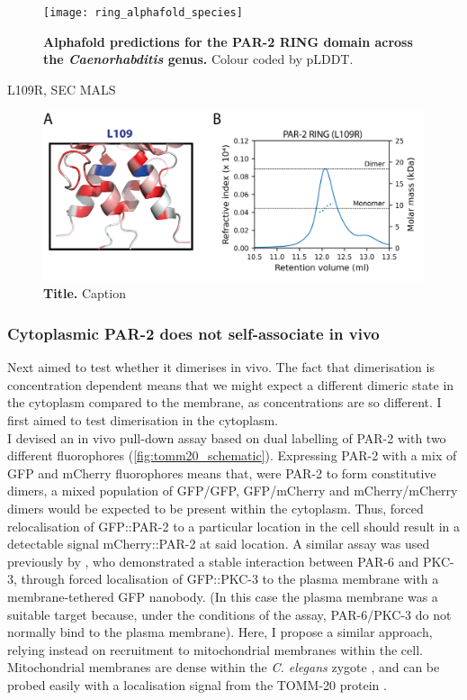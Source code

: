 \documentclass[12pt]{"article"}
\newcommand{\mycaption}[2]{\caption[#1]{\textbf{#1.} #2}}
\begin{document}
\begin{figure}
\texttt{[image: ring\_alphafold\_species]}
\centering
\mycaption{Alphafold predictions for the PAR-2 RING domain across the \textit{Caenorhabditis} genus}{
Colour coded by pLDDT.
}
\label{fig:ring_alphafold_species}
\end{figure}

L109R, SEC MALS\\

\begin{figure}
\includegraphics[scale=1]{l109r_sec_mals}
\centering
\mycaption{Title}{
Caption
}
\label{fig:l109r_sec_mals}
\end{figure}

\subsubsection{Cytoplasmic PAR-2  does not self-associate in vivo}

Next aimed to test whether it dimerises in vivo. The fact that dimerisation is concentration dependent means that we might expect a different dimeric state in the cytoplasm compared to the membrane, as concentrations are so different. I first aimed to test dimerisation in the cytoplasm.\\

I devised an in vivo pull-down assay based on dual labelling of PAR-2 with two different fluorophores (\cref{fig:tomm20_schematic}). Expressing PAR-2 with a mix of GFP and mCherry fluorophores means that, were PAR-2 to form constitutive dimers, a mixed population of GFP/GFP, GFP/mCherry and mCherry/mCherry dimers would be expected to be present within the cytoplasm. Thus, forced relocalisation of GFP::PAR-2 to a particular location in the cell should result in a detectable signal mCherry::PAR-2 at said location. A similar assay was used previously by \textcite{Reich2019}, who demonstrated a stable interaction between PAR-6 and PKC-3, through forced localisation of GFP::PKC-3 to the plasma membrane with a membrane-tethered GFP nanobody. (In this case the plasma membrane was a suitable target because, under the conditions of the assay, PAR-6/PKC-3 do not normally bind to the plasma membrane). Here, I propose a similar approach, relying instead on recruitment to mitochondrial membranes within the cell. Mitochondrial membranes are dense within the \textit{C. elegans} zygote \citep{Dinkelmann2003}, and can be probed easily with a localisation signal from the TOMM-20 protein \citep{Watanabe2011}.\\
\end{document}
